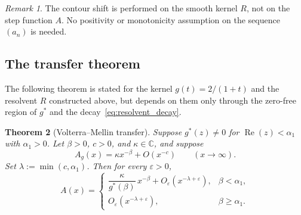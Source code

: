 \documentclass[11pt]{amsart}
\newtheorem{theorem}{Theorem}[section]
\theoremstyle{definition}
\theoremstyle{remark}
\newtheorem{remark}[theorem]{Remark}
\newcommand{\eps}{\varepsilon}
\newcommand{\Real}{\operatorname{Re}}
\begin{document}
\begin{remark}\label{rem:smooth}
The contour shift is performed on the smooth kernel $R$, not on the step function $A$. No positivity or monotonicity assumption on the sequence $(a_n)$ is needed.
\end{remark}


\subsection{The transfer theorem}

The following theorem is stated for the kernel $g(t) = 2/(1+t)$ and the resolvent $R$ constructed above, but depends on them only through the zero-free region of $g^*$ and the decay~\eqref{eq:resolvent_decay}.

\begin{theorem}[Volterra--Mellin transfer]\label{thm:transfer}
Suppose $g^*(z) \neq 0$ for $\Real(z) < \alpha_1$ with $\alpha_1 > 0$. Let $\beta > 0$, $c > 0$, and $\kappa \in \mathbb{C}$, and suppose
\begin{equation}\label{eq:Ag_asymp}
A_g(x) = \kappa x^{-\beta} + O(x^{-c}) \qquad (x \to \infty).
\end{equation}
Set $\lambda := \min(c, \alpha_1)$. Then for every $\eps > 0$,
\begin{equation}\label{eq:transfer_result}
A(x) = \begin{cases}
\dfrac{\kappa}{g^*(\beta)}\, x^{-\beta} + O_\eps(x^{-\lambda+\eps}), & \beta < \alpha_1, \\[6pt]
O_\eps(x^{-\lambda+\eps}), & \beta \geq \alpha_1.
\end{cases}
\end{equation}
\end{theorem}
\end{document}
